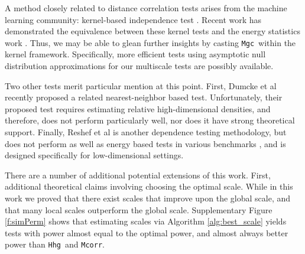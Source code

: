 \documentclass[11pt]{article}
\newcommand{\note}[2][]{\added[#1,remark={#2}]{}}
\providecommand{\sct}[1]{{\sc \texttt{#1}}}
\newcommand{\Mgc}{\sct{Mgc}}
\newcommand{\Hhg}{\sct{Hhg}}
\newcommand{\Mcorr}{\sct{Mcorr}}
\newcommand{\jv}[1]{{\note{jv: #1}}}
\newcommand{\cs}[1]{{\note{cs: #1}}}
\begin{document}
A method closely related to distance correlation tests arises from the machine learning community: kernel-based independence test  \cite{GrettonEtAl2005, GrettonGyorfi2010, GrettonEtAl2012}.  Recent work has demonstrated the equivalence between these kernel tests and the energy statistics work \cite{SejdinovicEtAl2013, RamdasEtAl2015}. Thus, we may be able to glean further insights by casting \Mgc~within the kernel framework. Specifically, more efficient tests using asymptotic null distribution approximations for our multiscale tests are possibly available.

Two other tests merit particular mention at this point.  First, Dumcke et al \cite{Dumcke2014} recently proposed a related nearest-neighbor based test.  Unfortunately, their proposed test requires estimating relative high-dimensional densities, and therefore, does not perform particularly well, nor does it have strong theoretical support.
Finally, Reshef et al \cite{Reshef2011} is another dependence testing methodology, but does not perform as well as energy based tests in various benchmarks \cite{SimonTibshirani2012}, and is designed specifically for low-dimensional settings.

\cs{maybe we should mention some sparsity something, since we are sparsifying?}
\jv{not sure what you mean above, let us talk}
\cs{i don't know where you are going with the below paragraph, so i removed}

There are a number of additional potential extensions of this work.  First, additional theoretical claims involving choosing the optimal scale. 
While in this work we proved that there exist scales that improve upon the global scale, and that many local scales outperform the global scale.
Supplementary Figure \ref{f:simPerm} shows that estimating scales via Algorithm \ref{alg:best_scale} yields tests with power almost equal to the optimal power, and almost always better power than \Hhg~and \Mcorr.  
\end{document}
